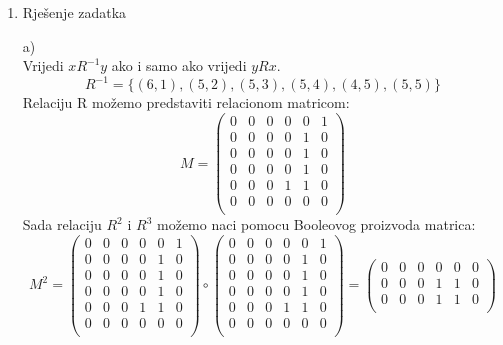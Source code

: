 \documentclass[12pt]{article}
\begin{document}
\begin{enumerate}
		
		
		\newpage
		\item Rješenje zadatka
		
		a) \\
		
		Vrijedi $xR^{-1}y$ ako i samo ako 
		 	vrijedi $yRx$.
		 	$$R^{-1} = \{(6, 1), (5, 2), (5, 3), (5, 4), (4, 5)
		 	, (5, 5)\}$$
		 	Relaciju R možemo predstaviti relacionom matricom:
		 	\begin{equation*}
				M = 
				\begin{pmatrix} 
					0 & 0 & 0 & 0 & 0 & 1\\ 
					0 & 0 & 0 & 0 & 1 & 0\\
					0 & 0 & 0 & 0 & 1 & 0\\
					0 & 0 & 0 & 0 & 1 & 0\\
					0 & 0 & 0 & 1 & 1 & 0\\
					0 & 0 & 0 & 0 & 0 & 0\\
				\end{pmatrix}
			\end{equation*}
		 	Sada relaciju $R^2$ i $R^3$ možemo naci pomocu
		 	Booleovog proizvoda matrica:
		 	\begin{equation*}
				M^2 = 
				\begin{pmatrix} 
					0 & 0 & 0 & 0 & 0 & 1\\ 
					0 & 0 & 0 & 0 & 1 & 0\\
					0 & 0 & 0 & 0 & 1 & 0\\
					0 & 0 & 0 & 0 & 1 & 0\\
					0 & 0 & 0 & 1 & 1 & 0\\
					0 & 0 & 0 & 0 & 0 & 0\\
				\end{pmatrix} \circ
				\begin{pmatrix} 
					0 & 0 & 0 & 0 & 0 & 1\\ 
					0 & 0 & 0 & 0 & 1 & 0\\
					0 & 0 & 0 & 0 & 1 & 0\\
					0 & 0 & 0 & 0 & 1 & 0\\
					0 & 0 & 0 & 1 & 1 & 0\\
					0 & 0 & 0 & 0 & 0 & 0\\
				\end{pmatrix} =
				\begin{pmatrix} 
					0 & 0 & 0 & 0 & 0 & 0\\ 
					0 & 0 & 0 & 1 & 1 & 0\\
					0 & 0 & 0 & 1 & 1 & 0\\

\end{pmatrix}
\end{equation*}
\end{enumerate}
\end{document}

